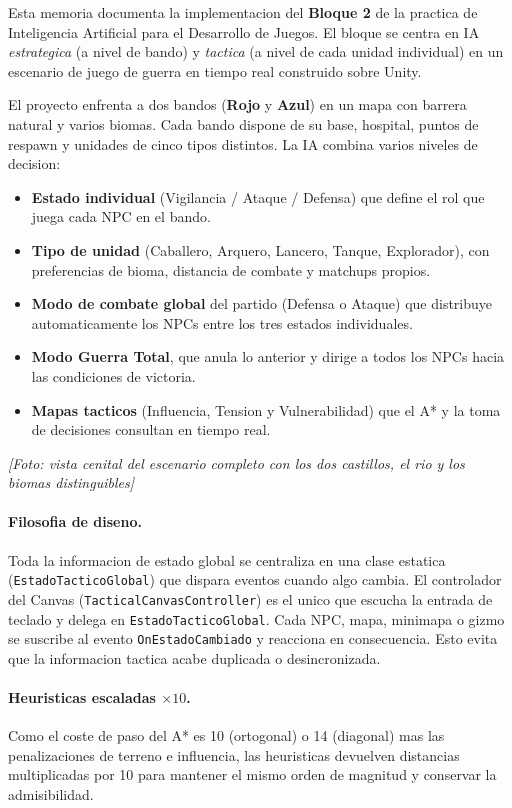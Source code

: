 \documentclass[12pt,a4paper]{article}
\newcommand{\fotoplaceholder}[1]{%
    \par\medskip\noindent%
    \begin{center}%
    \begin{tcolorbox}[
        colback=fotobg,
        colframe=fotoborder,
        boxrule=0.8pt,
        arc=2pt,
        width=0.85\textwidth,
        halign=center,
        valign=center,
        height=2.4cm
    ]
    \itshape\color{gray} [Foto: #1]
    \end{tcolorbox}%
    \end{center}\medskip%
}
\begin{document}
Esta memoria documenta la implementacion del \textbf{Bloque 2} de la
practica de Inteligencia Artificial para el Desarrollo de Juegos. El
bloque se centra en IA \emph{estrategica} (a nivel de bando) y
\emph{tactica} (a nivel de cada unidad individual) en un escenario de
juego de guerra en tiempo real construido sobre Unity.

El proyecto enfrenta a dos bandos (\textbf{Rojo} y \textbf{Azul}) en un
mapa con barrera natural y varios biomas. Cada bando dispone de su base,
hospital, puntos de respawn y unidades de cinco tipos distintos. La IA
combina varios niveles de decision:

\begin{itemize}[leftmargin=1.5em]
    \item \textbf{Estado individual} (Vigilancia / Ataque / Defensa) que define el rol que juega cada NPC en el bando.
    \item \textbf{Tipo de unidad} (Caballero, Arquero, Lancero, Tanque, Explorador), con preferencias de bioma, distancia de combate y matchups propios.
    \item \textbf{Modo de combate global} del partido (Defensa o Ataque) que distribuye automaticamente los NPCs entre los tres estados individuales.
    \item \textbf{Modo Guerra Total}, que anula lo anterior y dirige a todos los NPCs hacia las condiciones de victoria.
    \item \textbf{Mapas tacticos} (Influencia, Tension y Vulnerabilidad) que el A* y la toma de decisiones consultan en tiempo real.
\end{itemize}

\fotoplaceholder{vista cenital del escenario completo con los dos castillos, el rio y los biomas distinguibles}

\paragraph{Filosofia de diseno.}
Toda la informacion de estado global se centraliza en una clase
estatica (\texttt{EstadoTacticoGlobal}) que dispara eventos cuando algo
cambia. El controlador del Canvas (\texttt{TacticalCanvasController}) es
el unico que escucha la entrada de teclado y delega en
\texttt{EstadoTacticoGlobal}. Cada NPC, mapa, minimapa o gizmo se
suscribe al evento \texttt{OnEstadoCambiado} y reacciona en consecuencia.
Esto evita que la informacion tactica acabe duplicada o desincronizada.

\paragraph{Heuristicas escaladas $\times 10$.}
Como el coste de paso del A* es 10 (ortogonal) o 14 (diagonal) mas las
penalizaciones de terreno e influencia, las heuristicas devuelven
distancias multiplicadas por 10 para mantener el mismo orden de magnitud
y conservar la admisibilidad.
\end{document}
